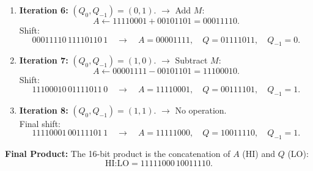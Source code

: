 \documentclass[12pt letter]{report}
\begin{document}
{\begin{enumerate}
          \[
            A \leftarrow 00010000 - 00101101 = 11100011.
          \]
          Shift:
          \[
            11100011\,11101101\,0 \quad\rightarrow\quad A = 11110001,\quad Q = 11110110,\quad Q_{-1} = 1.
          \]
    \item \textbf{Iteration 6:} \((Q_0, Q_{-1}) = (0,1)\). \(\rightarrow\) Add \(M\):
          \[
            A \leftarrow 11110001 + 00101101 = 00011110.
          \]
          Shift:
          \[
            00011110\,11110110\,1 \quad\rightarrow\quad A = 00001111,\quad Q = 01111011,\quad Q_{-1} = 0.
          \]
    \item \textbf{Iteration 7:} \((Q_0, Q_{-1}) = (1,0)\). \(\rightarrow\) Subtract \(M\):
          \[
            A \leftarrow 00001111 - 00101101 = 11100010.
          \]
          Shift:
          \[
            11100010\,01111011\,0 \quad\rightarrow\quad A = 11110001,\quad Q = 00111101,\quad Q_{-1} = 1.
          \]
    \item \textbf{Iteration 8:} \((Q_0, Q_{-1}) = (1,1)\). \(\rightarrow\) No operation.
          \\
          Final shift:
          \[
            11110001\,00111101\,1 \quad\rightarrow\quad A = 11111000,\quad Q = 10011110,\quad Q_{-1} = 1.
          \]
  \end{enumerate}

  \textbf{Final Product:} The 16-bit product is the concatenation of \(A\) (HI) and \(Q\) (LO):
  \[
    \text{HI:LO} = 11111000\,10011110.
  \]
}
\end{document}
